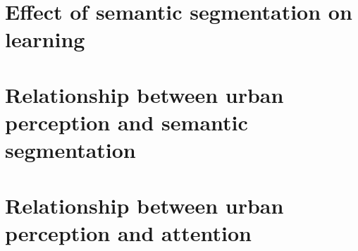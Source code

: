 \section{Effect of semantic segmentation on learning}

\section{Relationship between urban perception and semantic segmentation}

\section{Relationship between urban perception and attention}